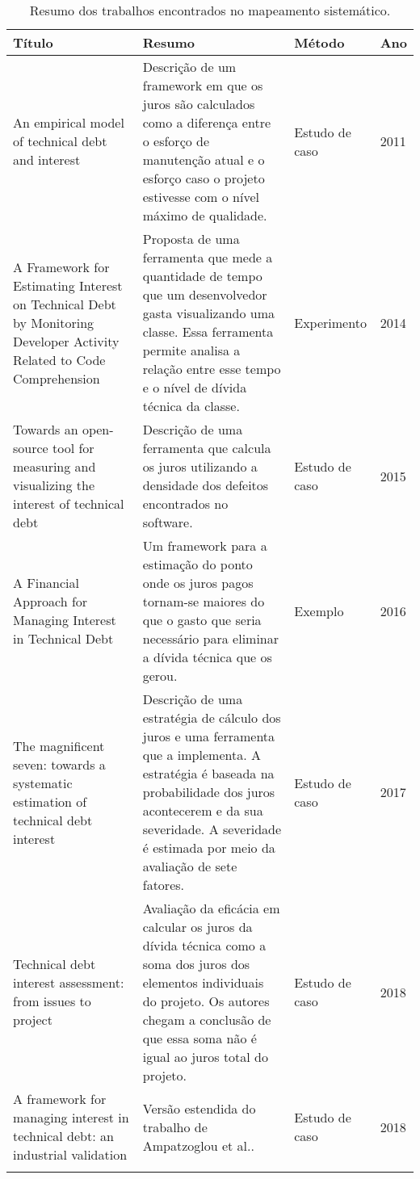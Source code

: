 \begin{longtable}{|m{6cm}|m{5cm}|m{2cm}|m{1cm}|}
\hline
\textbf{Título}                                                                                                              & \textbf{Resumo}             & \textbf{Método}         & \textbf{Ano}   \\  \hline
An empirical model of technical debt and interest \cite{nugroho2011empirical}                                                                  & Descrição de um framework em que os juros são calculados como a diferença entre o esforço de manutenção atual e o esforço caso o projeto estivesse com o nível máximo de qualidade. & Estudo de caso & 2011 \\ \hline
A Framework for Estimating Interest on Technical Debt by Monitoring Developer Activity Related to Code Comprehension\cite{singh2014framework} & Proposta de uma ferramenta que mede a quantidade de tempo que um desenvolvedor gasta visualizando uma classe. Essa ferramenta permite analisa a relação entre esse tempo e o nível de dívida técnica da classe.    & Experimento    & 2014 \\ \hline
Towards an open-source tool for measuring and visualizing the interest of technical debt\cite{falessi2015towards}                             & Descrição de uma ferramenta que calcula os juros utilizando a densidade dos defeitos encontrados no software.           & Estudo de caso & 2015 \\ \hline
A Financial Approach for Managing Interest in Technical Debt\cite{ampatzoglou2015financial}                                                         &   Um framework para a  estimação do ponto onde os juros pagos tornam-se maiores do que o gasto que seria necessário para eliminar a dívida técnica que os gerou.      & Exemplo        & 2016 \\ \hline
The magnificent seven: towards a systematic estimation of technical debt interest\cite{martini2017magnificent}                                    & Descrição de uma estratégia de cálculo dos juros e uma ferramenta que a implementa. A estratégia é baseada na probabilidade dos juros acontecerem e da sua severidade. A severidade é estimada por meio da avaliação de sete fatores.              & Estudo de caso & 2017 \\ \hline
Technical debt interest assessment: from issues to project \cite{martini2017technical}                                                        & Avaliação da eficácia em calcular os juros da dívida técnica como a soma dos juros dos elementos individuais do projeto. Os autores chegam a conclusão de que essa soma não é igual ao juros total do projeto.             & Estudo de caso & 2018 \\ \hline
A framework for managing interest in technical debt: an industrial validation\cite{ampatzoglou2018framework}                                        &       Versão estendida do trabalho de Ampatzoglou et al.\cite{ampatzoglou2015financial}.       & Estudo de caso & 2018 \\ \hline
\caption{Resumo dos trabalhos encontrados no mapeamento sistemático.}
\end{longtable}
\label{tab:resumo_trabalhos}

